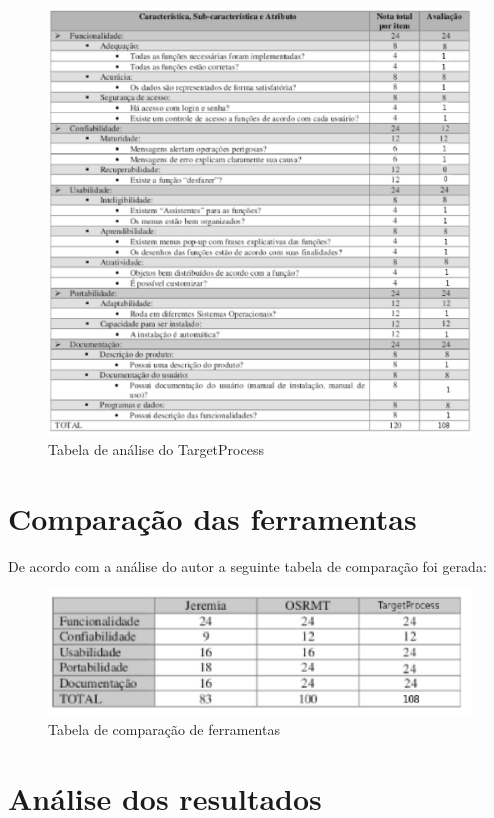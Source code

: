   \begin{figure}[!h]
    \centering
    \includegraphics[width=12cm, keepaspectratio=true]{figuras/ferramentas/target2.eps}
    \caption{Tabela de análise do TargetProcess}
  \end{figure}

\section{Comparação das ferramentas}

  De acordo com a análise do autor a seguinte tabela de comparação foi gerada:

  \begin{figure}[!h]
    \centering
    \includegraphics[width=15cm, keepaspectratio=true]{figuras/ferramentas/comp.eps}
    \caption{Tabela de comparação de ferramentas}
  \end{figure}

\section{Análise dos resultados}


